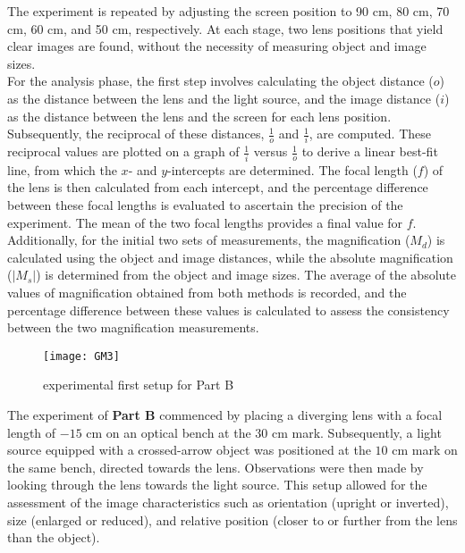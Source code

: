 \documentclass[a4paper,11pt]{article}
\begin{document}
The experiment is repeated by adjusting the screen position to 90 cm, 80 cm, 70 cm, 60 cm, and 50 cm, respectively. At each stage, two lens positions that yield clear images are found, without the necessity of measuring object and image sizes.\\

For the analysis phase, the first step involves calculating the object distance ($o$) as the distance between the lens and the light source, and the image distance ($i$) as the distance between the lens and the screen for each lens position. Subsequently, the reciprocal of these distances, $\frac{1}{o}$ and $\frac{1}{i}$, are computed. These reciprocal values are plotted on a graph of $\frac{1}{i}$ versus $\frac{1}{o}$ to derive a linear best-fit line, from which the $x$- and $y$-intercepts are determined. The focal length ($f$) of the lens is then calculated from each intercept, and the percentage difference between these focal lengths is evaluated to ascertain the precision of the experiment. The mean of the two focal lengths provides a final value for $f$.\\

Additionally, for the initial two sets of measurements, the magnification ($M_d$) is calculated using the object and image distances, while the absolute magnification ($\lvert M_s \rvert$) is determined from the object and image sizes. The average of the absolute values of magnification obtained from both methods is recorded, and the percentage difference between these values is calculated to assess the consistency between the two magnification measurements.\\

\newpage
\begin{figure}[htbp]
\centering
\texttt{[image: GM3]}
\caption{experimental first setup for Part B}
\label{6}
\end{figure}
The experiment of \textbf{Part B} commenced by placing a diverging lens with a focal length of $-15$ cm on an optical bench at the $30$ cm mark. Subsequently, a light source equipped with a crossed-arrow object was positioned at the $10$ cm mark on the same bench, directed towards the lens. Observations were then made by looking through the lens towards the light source. This setup allowed for the assessment of the image characteristics such as orientation (upright or inverted), size (enlarged or reduced), and relative position (closer to or further from the lens than the object).\\
\end{document}

